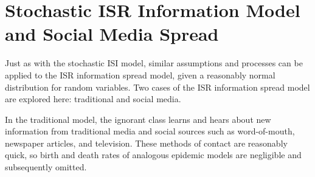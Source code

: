 \section{Stochastic ISR Information Model and Social Media Spread}
Just as with the stochastic ISI model, similar assumptions and processes can be applied to the ISR information spread model, given a reasonably normal distribution for random variables. Two cases of the ISR information spread model are explored here: traditional and social media. 

In the traditional model, the ignorant class learns and hears about new information from traditional media and social sources such as word-of-mouth, newspaper articles, and television. These methods of contact are reasonably quick, so birth and death rates of analogous epidemic models are negligible and subsequently omitted.

